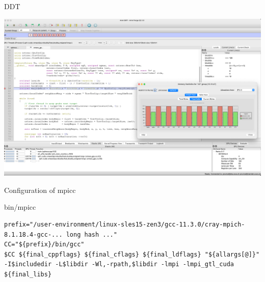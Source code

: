 \documentclass[aspectratio=43]{beamer}
\begin{document}


\begin{frame}[fragile]{DDT}
    \begin{center}
        \includegraphics[width=\textwidth]{images/sph-ddt-uenv.png}
    \end{center}
\end{frame}

\begin{frame}[fragile]{Configuration of mpicc}
\begin{code}{bin/mpicc}
    \begin{lstlisting}[style=talkbash]
prefix="/user-environment/linux-sles15-zen3/gcc-11.3.0/cray-mpich-8.1.18.4-gcc-... long hash ..."
CC="${prefix}/bin/gcc"
$CC ${final_cppflags} ${final_cflags} ${final_ldflags} "${allargs[@]}" -I$includedir -L$libdir -Wl,-rpath,$libdir -lmpi -lmpi_gtl_cuda ${final_libs} \end{lstlisting}
\end{code}

\end{frame}
\end{document}
